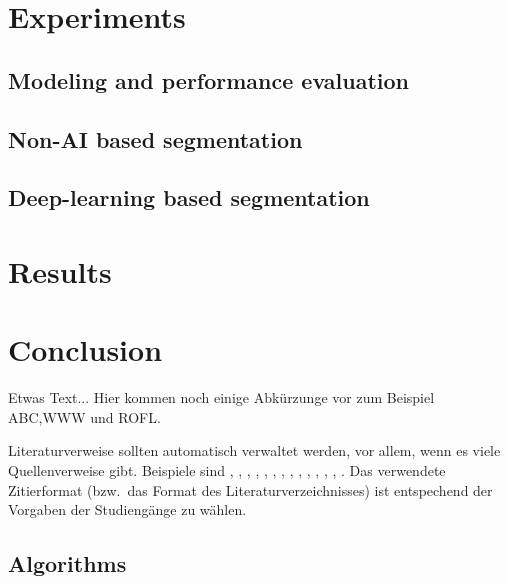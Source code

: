 \documentclass[Master,MDS,english]{BASE/twbook} %
\begin{document}
\chapter{Experiments} %

\section{Modeling and performance evaluation} 



\section{Non-AI based segmentation}




\section{Deep-learning based segmentation}



\chapter{Results} %





\chapter{Conclusion} %





Etwas Text... Hier kommen noch einige Abkürzunge vor zum Beispiel \ac{ABC},\ac{WWW} und \ac{ROFL}.


Literaturverweise sollten automatisch verwaltet werden, vor allem, wenn es viele Quellenverweise gibt. Beispiele sind  \cite{Ko05a}, \cite{Ko05b}, \cite{MiGo05}, \cite{TeGo14}, \cite{HuHa07}, \cite{HuZi10}, \cite{ZiKu07}, \cite{He07}, \cite{SIE11}, \cite{SIE14}, \cite{ISO98}, \cite{ATM11}, \cite{Hu11}, \cite{Po10}. Das verwendete Zitierformat (bzw.~das Format des Literaturverzeichnisses) ist entspechend der Vorgaben der Studiengänge zu wählen.



\section{Algorithms}
\end{document}
